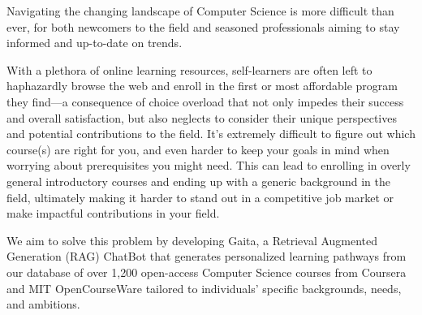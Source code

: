 



Navigating the changing landscape of Computer Science is more difficult than ever, for both newcomers to the field and seasoned professionals aiming to stay informed and up-to-date on trends.

With a plethora of online learning resources, self-learners are often left to haphazardly browse the web and enroll in the first or most affordable program they find—a consequence of choice overload that not only impedes their success and overall satisfaction, but also neglects to consider their unique perspectives and potential contributions to the field. It’s extremely difficult to figure out which course(s) are right for you, and even harder to keep your goals in mind when worrying about prerequisites you might need. This can lead to enrolling in overly general introductory courses and ending up with a generic background in the field, ultimately making it harder to stand out in a competitive job market or make impactful contributions in your field.

We aim to solve this problem by developing Gaita, a Retrieval Augmented Generation (RAG) ChatBot that generates personalized learning pathways from our database of over 1,200 open-access Computer Science courses from Coursera and MIT OpenCourseWare tailored to individuals’ specific backgrounds, needs, and ambitions.




